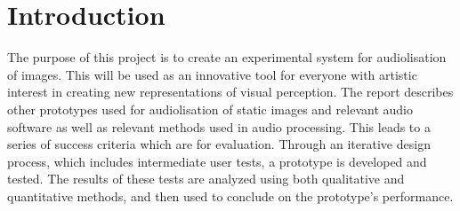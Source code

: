 \chapter{Introduction}\label{ch:introduction}
The purpose of this project is to create an experimental system for audiolisation of images. This will be used as an innovative tool for everyone with artistic interest in creating new representations of visual perception. The report describes other prototypes used for audiolisation of static images and relevant audio software as well as relevant methods used in audio processing. This leads to a series of success criteria which are for evaluation. Through an iterative design process, which includes intermediate user tests, a prototype is developed and tested. The results of these tests are analyzed using both qualitative and quantitative methods, and then used to conclude on the prototype's performance. 
